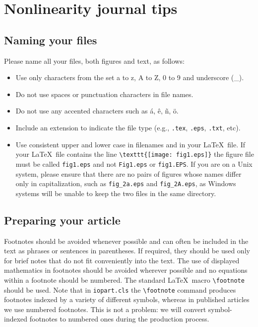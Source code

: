 
\section{Nonlinearity journal tips}
\label{s:NonlinTips}


\subsection{Naming your files}

Please name all your files, both figures and text, as follows:
\begin{itemize}
\item Use only characters from the set a to z, A to Z, 0 to 9 and underscore (\_).
\item Do not use spaces or punctuation characters in file names.
\item Do not use any accented characters such as
\'a, \^e, \~n, \"o.
\item Include an extension to indicate the file type (e.g., \verb".tex", \verb".eps", \verb".txt", etc).
\item Use consistent upper and lower case in filenames and in your \LaTeX\ file.
If your \LaTeX\ file contains the line \verb"\texttt{[image: fig1.eps]}" the figure file must be called
\verb"fig1.eps" and not \verb"Fig1.eps" or \verb"fig1.EPS".  If you are on a Unix system, please ensure that
there are no pairs of figures whose names differ only in capitalization, such as \verb"fig_2a.eps" and \verb"fig_2A.eps",
as Windows systems will be unable to keep the two files in the same directory.
\end{itemize}

\subsection{Preparing your article}

Footnotes should be avoided whenever possible and can often be included
in the text as phrases or sentences in parentheses. If required, they
should be used only for brief notes that do not fit conveniently into the
text. The use of displayed mathematics in footnotes should be avoided
wherever possible and no equations within a footnote should be numbered.
The standard \LaTeX\ macro \verb"\footnote" should be used.  Note that in
\verb"iopart.cls" the \verb"\footnote" command produces footnotes indexed
by a variety of different symbols, whereas in published articles we use
numbered footnotes.  This is not a problem: we will convert
symbol-indexed footnotes to numbered ones during the production process.

